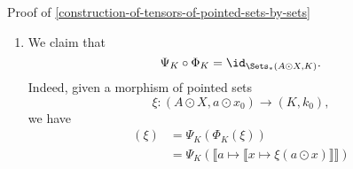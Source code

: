 \begin{Proof}{Proof of \cref{construction-of-tensors-of-pointed-sets-by-sets}}
\begin{enumerate}
            \[
                \Psi_{K}%
                \colon%
                \Sets(A,\Sets_{*}(X,K))%
                \to
                \Sets_{*}(A\odot X,K)
            \]%
            given by sending a map
            \begin{webcompile}
                \phantom{\xi\colon}
            \end{webcompile}
            to the morphism of pointed sets
            \[
                \xi^{\dagger}%
                \colon%
                (A\odot X,a\odot x_{0})%
                \to%
                (K,k_{0})%
            \]%
            defined by
            \[
                \xi^{\dagger}(a\odot x)%
                \defeq%
                \xi_{a}(x)%
            \]%
            for each $a\odot x\in A\odot X$. Note that $\xi^{\dagger}$ is indeed a morphism of pointed sets, as we have
            \begin{align*}
                \xi^{\dagger}(a\odot x_{0}) &\defeq \xi_{a}(x_{0})\\%
                                           &=      k_{0},
            \end{align*}
            where we have used that $\xi(a)\in\Sets_{*}(X,K)$ is a morphism of pointed sets.
        \item\label{proof-of-construction-of-tensors-of-pointed-sets-by-sets-3}We claim that
            \[
                \Psi_{K}\circ\Phi_{K}%
                =%
                \id_{\Sets_{*}(A\odot X,K)}.%
            \]%
            Indeed, given a morphism of pointed sets
            \[
                \xi%
                \colon%
                (A\odot X,a\odot x_{0})%
                \to%
                (K,k_{0}),%
            \]%
            we have
            \begin{align*}
                [\Psi_{K}\circ\Phi_{K}](\xi) &= \Psi_{K}(\Phi_{K}(\xi))\\%
                                             &= \Psi_{K}(\llbracket a\mapsto\llbracket x\mapsto\xi(a\odot x)\rrbracket\rrbracket)\\%

\end{align*}
\end{enumerate}
\end{Proof}
